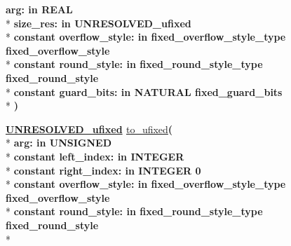 \begin{DoxyCompactItemize}
{\bfseries \textcolor{vhdlchar}{arg\+: }\textcolor{stringliteral}{in }{\bfseries \textcolor{comment}{R\+E\+A\+L}\textcolor{vhdlchar}{ }}}\\*
{\bfseries \textcolor{vhdlchar}{size\+\_\+res\+: }\textcolor{stringliteral}{in }\textcolor{vhdlchar}{U\+N\+R\+E\+S\+O\+L\+V\+E\+D\+\_\+ufixed}}\\*
{\bfseries {\bfseries \textcolor{keywordflow}{constant}\textcolor{vhdlchar}{ }}\textcolor{vhdlchar}{overflow\+\_\+style\+: }\textcolor{stringliteral}{in }\textcolor{vhdlchar}{fixed\+\_\+overflow\+\_\+style\+\_\+type     fixed\+\_\+overflow\+\_\+style}}\\*
{\bfseries {\bfseries \textcolor{keywordflow}{constant}\textcolor{vhdlchar}{ }}\textcolor{vhdlchar}{round\+\_\+style\+: }\textcolor{stringliteral}{in }\textcolor{vhdlchar}{fixed\+\_\+round\+\_\+style\+\_\+type     fixed\+\_\+round\+\_\+style}}\\*
{\bfseries {\bfseries \textcolor{keywordflow}{constant}\textcolor{vhdlchar}{ }}\textcolor{vhdlchar}{guard\+\_\+bits\+: }\textcolor{stringliteral}{in }\textcolor{vhdlchar}{N\+A\+T\+U\+R\+A\+L     fixed\+\_\+guard\+\_\+bits}}\\*
{\bfseries  )} 
\item 
{\bfseries {\bfseries {\bfseries \hyperlink{classfixed__pkg_ae78bc2b36d22f6abeac163955e8a587d}{U\+N\+R\+E\+S\+O\+L\+V\+E\+D\+\_\+ufixed}} \textcolor{vhdlchar}{ }}} \hyperlink{classfixed__pkg_a1c021bc528d8e3b63c69f6bf47c8053e}{to\+\_\+ufixed}{\bfseries  ( }\\*
{\bfseries \textcolor{vhdlchar}{arg\+: }\textcolor{stringliteral}{in }{\bfseries \textcolor{comment}{U\+N\+S\+I\+G\+N\+E\+D}\textcolor{vhdlchar}{ }}}\\*
{\bfseries {\bfseries \textcolor{keywordflow}{constant}\textcolor{vhdlchar}{ }}\textcolor{vhdlchar}{left\+\_\+index\+: }\textcolor{stringliteral}{in }{\bfseries \textcolor{comment}{I\+N\+T\+E\+G\+E\+R}\textcolor{vhdlchar}{ }}}\\*
{\bfseries {\bfseries \textcolor{keywordflow}{constant}\textcolor{vhdlchar}{ }}\textcolor{vhdlchar}{right\+\_\+index\+: }\textcolor{stringliteral}{in }\textcolor{vhdlchar}{I\+N\+T\+E\+G\+E\+R   0}}\\*
{\bfseries {\bfseries \textcolor{keywordflow}{constant}\textcolor{vhdlchar}{ }}\textcolor{vhdlchar}{overflow\+\_\+style\+: }\textcolor{stringliteral}{in }\textcolor{vhdlchar}{fixed\+\_\+overflow\+\_\+style\+\_\+type     fixed\+\_\+overflow\+\_\+style}}\\*
{\bfseries {\bfseries \textcolor{keywordflow}{constant}\textcolor{vhdlchar}{ }}\textcolor{vhdlchar}{round\+\_\+style\+: }\textcolor{stringliteral}{in }\textcolor{vhdlchar}{fixed\+\_\+round\+\_\+style\+\_\+type     fixed\+\_\+round\+\_\+style}}\\*

\end{DoxyCompactItemize}
